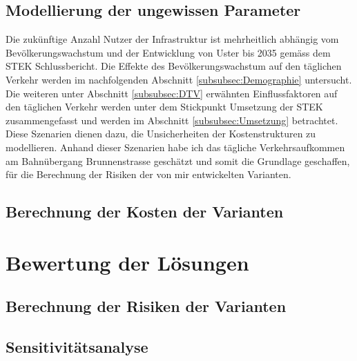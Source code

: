 	\subsection{Modellierung der ungewissen Parameter}
	\label{subsec:Szenarien}
	
Die zukünftige Anzahl Nutzer der Infrastruktur ist mehrheitlich abhängig vom Bevölkerungswachstum und der Entwicklung von Uster bis 2035 gemäss dem STEK Schlussbericht.
Die Effekte des Bevölkerungswachstum auf den täglichen Verkehr werden im nachfolgenden Abschnitt \ref{subsubsec:Demographie} untersucht.  
Die weiteren unter Abschnitt \ref{subsubsec:DTV} erwähnten Einflussfaktoren auf den täglichen Verkehr werden unter dem Stickpunkt Umsetzung der STEK zusammengefasst und werden im Abschnitt \ref{subsubsec:Umsetzung} betrachtet.
Diese Szenarien dienen dazu, die Unsicherheiten der Kostenstrukturen zu modellieren.
Anhand dieser Szenarien habe ich das tägliche Verkehrsaufkommen am Bahnübergang Brunnenstrasse geschätzt und somit die Grundlage geschaffen, für die Berechnung der Risiken der von mir entwickelten Varianten.	
	
	


	\subsection{Berechnung der Kosten der Varianten}
	



\section{Bewertung der Lösungen}
\label{sec:Bewertung}

	\subsection{Berechnung der Risiken der Varianten}
	

	\subsection{Sensitivitätsanalyse}
	

%

